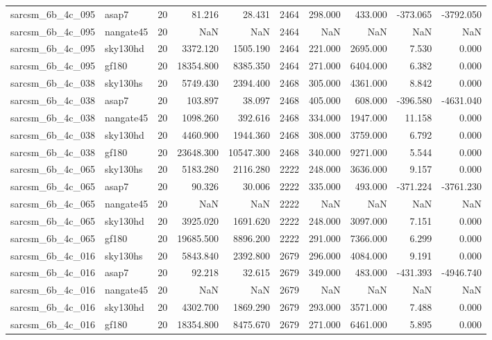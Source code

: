 \begin{tabular}{llrrrrrrrr}
sarcsm\_6b\_4c\_095 & asap7 & 20 & 81.216 & 28.431 & 2464 & 298.000 & 433.000 & -373.065 & -3792.050 \\
sarcsm\_6b\_4c\_095 & nangate45 & 20 & NaN & NaN & 2464 & NaN & NaN & NaN & NaN \\
sarcsm\_6b\_4c\_095 & sky130hd & 20 & 3372.120 & 1505.190 & 2464 & 221.000 & 2695.000 & 7.530 & 0.000 \\
sarcsm\_6b\_4c\_095 & gf180 & 20 & 18354.800 & 8385.350 & 2464 & 271.000 & 6404.000 & 6.382 & 0.000 \\
sarcsm\_6b\_4c\_038 & sky130hs & 20 & 5749.430 & 2394.400 & 2468 & 305.000 & 4361.000 & 8.842 & 0.000 \\
sarcsm\_6b\_4c\_038 & asap7 & 20 & 103.897 & 38.097 & 2468 & 405.000 & 608.000 & -396.580 & -4631.040 \\
sarcsm\_6b\_4c\_038 & nangate45 & 20 & 1098.260 & 392.616 & 2468 & 334.000 & 1947.000 & 11.158 & 0.000 \\
sarcsm\_6b\_4c\_038 & sky130hd & 20 & 4460.900 & 1944.360 & 2468 & 308.000 & 3759.000 & 6.792 & 0.000 \\
sarcsm\_6b\_4c\_038 & gf180 & 20 & 23648.300 & 10547.300 & 2468 & 340.000 & 9271.000 & 5.544 & 0.000 \\
sarcsm\_6b\_4c\_065 & sky130hs & 20 & 5183.280 & 2116.280 & 2222 & 248.000 & 3636.000 & 9.157 & 0.000 \\
sarcsm\_6b\_4c\_065 & asap7 & 20 & 90.326 & 30.006 & 2222 & 335.000 & 493.000 & -371.224 & -3761.230 \\
sarcsm\_6b\_4c\_065 & nangate45 & 20 & NaN & NaN & 2222 & NaN & NaN & NaN & NaN \\
sarcsm\_6b\_4c\_065 & sky130hd & 20 & 3925.020 & 1691.620 & 2222 & 248.000 & 3097.000 & 7.151 & 0.000 \\
sarcsm\_6b\_4c\_065 & gf180 & 20 & 19685.500 & 8896.200 & 2222 & 291.000 & 7366.000 & 6.299 & 0.000 \\
sarcsm\_6b\_4c\_016 & sky130hs & 20 & 5843.840 & 2392.800 & 2679 & 296.000 & 4084.000 & 9.191 & 0.000 \\
sarcsm\_6b\_4c\_016 & asap7 & 20 & 92.218 & 32.615 & 2679 & 349.000 & 483.000 & -431.393 & -4946.740 \\
sarcsm\_6b\_4c\_016 & nangate45 & 20 & NaN & NaN & 2679 & NaN & NaN & NaN & NaN \\
sarcsm\_6b\_4c\_016 & sky130hd & 20 & 4302.700 & 1869.290 & 2679 & 293.000 & 3571.000 & 7.488 & 0.000 \\
sarcsm\_6b\_4c\_016 & gf180 & 20 & 18354.800 & 8475.670 & 2679 & 271.000 & 6461.000 & 5.895 & 0.000 \\

\end{tabular}
